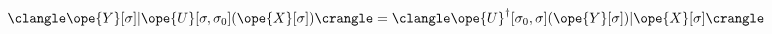 \begin{equation}	\label{12.19}
\clangle \ope{Y}[\sigma] |
		\ope{U}[\sigma,\sigma_0] (\ope{X}[\sigma]) \crangle
=
\clangle \ope{U}^\dag[\sigma_0,\sigma] (\ope{Y}[\sigma]) |
					\ope{X}[\sigma] \crangle
	\end{equation}

